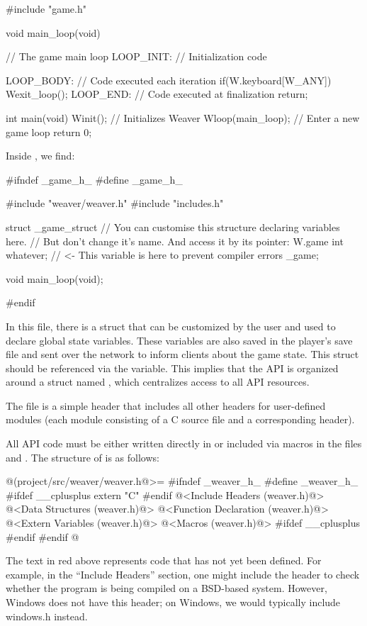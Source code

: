 \alinhaverbatim
#include "game.h"

void main_loop(void){ // The game main loop
 LOOP_INIT: // Initialization code 

 LOOP_BODY: // Code executed each iteration
    if(W.keyboard[W_ANY])
        Wexit_loop();
 LOOP_END: // Code executed at finalization
    return;
}

int main(void){
  Winit(); // Initializes Weaver
  Wloop(main_loop); // Enter a new game loop
  return 0;
}
\alinhanormal

Inside , we find:

\alinhaverbatim
#ifndef _game_h_
#define _game_h_

#include "weaver/weaver.h"
#include "includes.h"

struct _game_struct{
  // You can customise this structure declaring variables here.
  // But don't change it's name. And access it by its pointer: W.game
  int whatever; // <- This variable is here to prevent compiler errors
} _game;

void main_loop(void);

#endif
\alinhanormal

In this file, there is a struct that can be customized by the user and
used to declare global state variables. These variables are also saved
in the player's save file and sent over the network to inform clients
about the game state. This struct should be referenced via
the  variable. This implies that the API is
organized around a struct named , which centralizes
access to all API resources.

The file  is a simple header that includes all
other headers for user-defined modules (each module consisting of a C
source file and a corresponding header).

All API code must be either written directly in or included via macros
in the files  and . The
structure of  is as follows:

\iniciocodigo
@(project/src/weaver/weaver.h@>=
#ifndef _weaver_h_
#define _weaver_h_
#ifdef __cplusplus
  extern "C" {
#endif
@<Include Headers (weaver.h)@>
@<Data Structures (weaver.h)@>
@<Function Declaration (weaver.h)@>
@<Extern Variables (weaver.h)@>
@<Macros (weaver.h)@>
#ifdef __cplusplus
  }
#endif
#endif
@
\fimcodigo

The text in red above represents code that has not yet been
defined. For example, in the ``Include Headers'' section, one might
include the header  to check whether the
program is being compiled on a BSD-based system. However, Windows does
not have this header; on Windows, we would typically include windows.h
instead.

